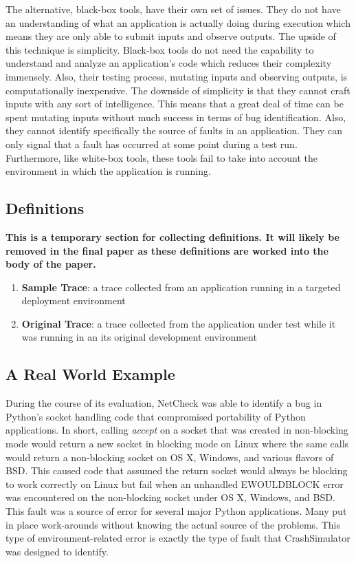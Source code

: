         The alternative, black-box tools, have their own set of issues. They do not have an understanding of what an
        application is actually doing during execution which means they are only able to submit inputs and observe
        outputs.  The upside of this technique is simplicity. Black-box tools do not need the capability to understand
        and analyze an application's code which reduces their complexity immensely. Also, their testing process,
        mutating inputs and observing outputs, is computationally inexpensive. The downside of simplicity is that they
        cannot craft inputs with any sort of intelligence. This means that a great deal of time can be spent mutating
        inputs without much success in terms of bug identification. Also, they cannot identify specifically the source
        of faults in an application. They can only signal that a fault has occurred at some point during a test run.
        Furthermore, like white-box tools, these tools fail to take into account the environment in which the
        application is running.

    \subsection{Definitions}
        \textbf{This is a temporary section for collecting definitions. It will likely be removed in the final paper as
        these definitions are worked into the body of the paper.}
        \begin{enumerate}
            \item{\textbf{Sample Trace}: a trace collected from an application running in a targeted deployment
                environment}
            \item{\textbf{Original Trace}: a trace collected from the application under test while it was running in an
                its original development environment}
        \end{enumerate}

    \subsection{A Real World Example}

        During the course of its evaluation, NetCheck was able to identify a bug in Python's socket handling code that
        compromised portability of Python applications. In short, calling \emph{accept} on a socket that was created in
        non-blocking mode would return a new socket in blocking mode on Linux where the same calls would return a
        non-blocking socket on OS X, Windows, and various flavors of BSD\@. This caused code that assumed the return
        socket would always be blocking to work correctly on Linux but fail when an unhandled EWOULDBLOCK error was
        encountered on the non-blocking socket under OS X, Windows, and BSD\@. This fault was a source of error for
        several major Python applications. Many put in place work-arounds without knowing the actual source of the
        problems.  This type of environment-related error is exactly the type of fault that CrashSimulator was designed
        to identify.

